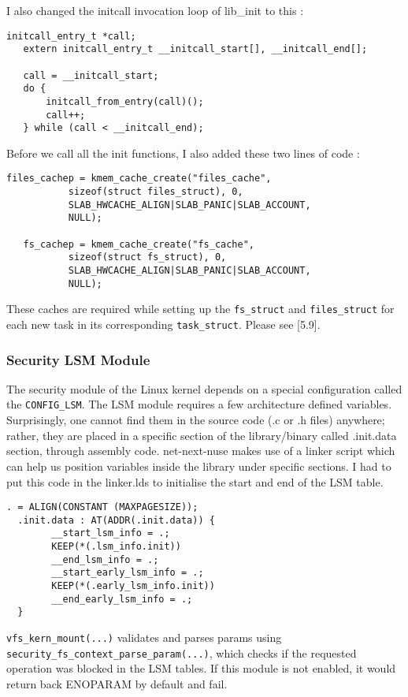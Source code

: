 \documentclass{sig-alternate}
\begin{document}
I also changed the initcall invocation loop of lib\_init to this : 
\begin{lstlisting}[style=CStyle] 
   initcall_entry_t *call;
   extern initcall_entry_t __initcall_start[], __initcall_end[];
 
   call = __initcall_start;
   do {               
       initcall_from_entry(call)();               
       call++;
   } while (call < __initcall_end);

\end{lstlisting}

Before we call all the init functions, I also added these two lines of code :

\begin{lstlisting}[style=CStyle]
   files_cachep = kmem_cache_create("files_cache",
           sizeof(struct files_struct), 0,
           SLAB_HWCACHE_ALIGN|SLAB_PANIC|SLAB_ACCOUNT,
           NULL);
 
   fs_cachep = kmem_cache_create("fs_cache",
           sizeof(struct fs_struct), 0,
           SLAB_HWCACHE_ALIGN|SLAB_PANIC|SLAB_ACCOUNT,
           NULL);
\end{lstlisting}

These caches are required while setting up the \texttt{fs\_struct} and \texttt{files\_struct} for each new task in its corresponding \texttt{task\_struct}. Please see [5.9].


\subsubsection{Security LSM Module}
The security module of the Linux kernel depends on a special configuration called the \texttt{CONFIG\_LSM}. The LSM module requires a few architecture
defined variables. Surprisingly, one cannot find them in the source code (.c or .h files) anywhere; rather, they are placed in a specific section
of the library/binary called .init.data section, through assembly code. net-next-nuse makes use of a linker script which can help us position variables inside
the library under specific sections. I had to put this code in the linker.lds to initialise the start and end of the LSM table.
\begin{lstlisting}[style=CStyle]
  . = ALIGN(CONSTANT (MAXPAGESIZE));
  .init.data : AT(ADDR(.init.data)) {    
		__start_lsm_info = .;	
		KEEP(*(.lsm_info.init))
		__end_lsm_info = .;    
		__start_early_lsm_info = .;	
		KEEP(*(.early_lsm_info.init))
		__end_early_lsm_info = .;
  }
\end{lstlisting}
\texttt{vfs\_kern\_mount(...)} validates and parses params using \texttt{security\_fs\_context\_parse\_param(...)}, which checks if the requested operation was blocked
in the LSM tables. If this module is not enabled, it would return back ENOPARAM by default and fail.
\end{document}
